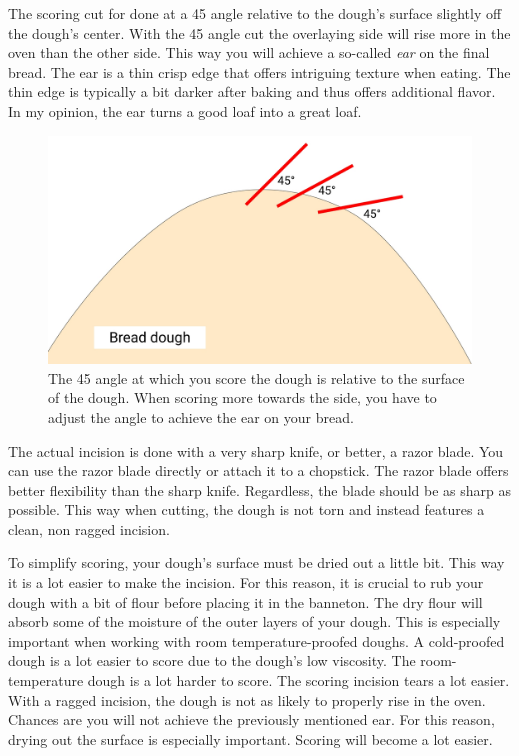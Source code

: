 The scoring cut for done at a \qty{45}{\angle} angle relative to the dough's
surface slightly off the dough's center. With the \qty{45}{\angle} angle cut
the overlaying side will rise more in the oven than the other side.
This way you will achieve a so-called \emph{ear} on the final bread.
The ear is a thin crisp edge that offers intriguing texture
when eating. The thin edge is typically a bit darker after baking
and thus offers additional flavor. In my opinion, the ear turns
a good loaf into a great loaf.

\begin{figure}[htb!]
  \includegraphics[width=\textwidth]{bread-scoring-angle}
  \caption[Scoring angle]{The \qty{45}{\angle} angle at which you score the
      dough is relative to the surface of the dough.  When scoring more towards
      the side, you have to adjust the angle to achieve the ear on your
      bread.}%
  \label{fig:scoring-angle}
\end{figure}

The actual incision is done with a very sharp knife, or better, a razor
blade. You can use the razor blade directly or attach it to a chopstick.
The razor blade offers better flexibility than the sharp knife.
Regardless, the blade should be as sharp as possible. This way when cutting,
the dough is not torn and instead features a clean, non ragged incision.

To simplify scoring, your dough's surface must be dried out a little bit.
This way it is a lot easier to make the incision.
For this reason, it is crucial to rub your dough with a bit of flour
before placing it in the banneton. The dry flour will absorb some of the
moisture of the outer layers of your dough. This is especially important
when working with room temperature-proofed doughs. A cold-proofed dough
is a lot easier to score due to the dough's low viscosity. The room-temperature
dough is a lot harder to score. The scoring incision tears a lot
easier. With a ragged incision, the dough is not as likely to properly
rise in the oven. Chances are you will not achieve the previously mentioned
ear. For this reason, drying out the surface is especially important. Scoring
will become a lot easier.

